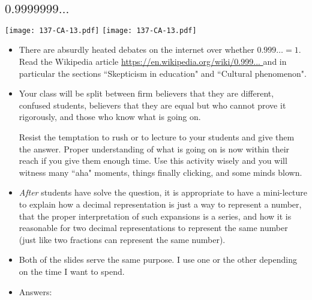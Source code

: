 \documentclass[11pt]{article}
\newcommand {\DS} [1] {${\displaystyle #1}$}
\newcommand{\nl}{\hfill \vspace{-1.1\baselineskip}} %
\begin{document}
\newpage
\subsection{$0.9999999 \ldots$}

\begin{center}
{ \texttt{[image: 137-CA-13.pdf]}}  \quad
{ \texttt{[image: 137-CA-13.pdf]}} 
\end{center}

\begin{comments}
\nl
	\begin{itemize}
		\item   There are absurdly heated debates on the internet over whether $0.999 \ldots = 1$.  Read the Wikipedia article
		\href{https://en.wikipedia.org/wiki/0.999... }{https://en.wikipedia.org/wiki/0.999... } and in particular the sections ``Skepticism in education" and ``Cultural phenomenon".
		\item Your class will be split between firm believers that they are different, confused students, believers that they are equal but who cannot prove it rigorously, and those who know what is going on.
		
		Resist the temptation to rush or to lecture to your students and give them the answer.  Proper understanding of what is going on is now within their reach if you give them enough time.    Use this activity wisely and you will witness many ``aha" moments, things finally clicking, and some minds blown.
		
		\item \emph{After} students have solve the question, it is appropriate to have a mini-lecture to explain how a decimal representation is just a way to represent a number, that the proper interpretation of such expansions is a series, and how it is reasonable for two decimal representations to represent the same number (just like two fractions can represent the same number).
		
		\item Both of the slides serve the same purpose.  I use one or the other depending on the time I want to spend.
		
		\item Answers:
			\begin{itemize}
			\end{itemize}
	\end{itemize}
\end{comments}
\end{document}
